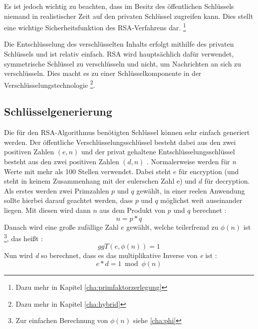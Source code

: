 \documentclass[12pt,a4paper]{scrartcl}
\begin{document}
Es ist jedoch wichtig zu beachten, dass im Besitz des öffentlichen Schlüssels niemand in realistischer Zeit auf den privaten Schlüssel zugreifen kann. Dies stellt eine wichtige Sicherheitsfunktion des RSA-Verfahrens dar. \footnote{Dazu mehr in Kapitel \ref{cha:primfaktorzerlegung}}

Die Entschlüsselung des verschlüsselten Inhalts erfolgt mithilfe des privaten Schlüssels und ist relativ einfach. RSA wird hauptsächlich dafür verwendet, symmetrische Schlüssel zu verschlüsseln und nicht, um Nachrichten an sich zu verschlüsseln. Dies macht es zu einer Schlüsselkomponente in der Verschlüsselungstechnologie \footnote{Dazu mehr in Kapitel \ref{cha:hybrid}}.

	\subsection{Schlüsselgenerierung}
Die für den RSA-Algorithmus benötigten Schlüssel können sehr einfach generiert werden. Der öffentliche Verschlüsselungsschlüssel besteht dabei aus den zwei positiven Zahlen $(e, n)$ und der privat gehaltene Entschlüsselungsschlüssel besteht aus den zwei positiven Zahlen $(d, n)$ \cite[S.6]{rsaOriginalPaper}. Normalerweise   werden für \textit{n} Werte mit mehr als 100 Stellen verwendet. Dabei steht $e$ für encryption (und steht in keinem Zusammenhang mit der eulerschen Zahl e) und $d$ für decryption.  
Als erstes werden zwei Primzahlen $p$ und $q$ gewählt, in einer reelen Anwendung sollte hierbei darauf geachtet werden, dass $p$ und $q$ möglichst weit auseinander liegen. \cite[S.8f]{rowland}
Mit diesen wird dann $n$ aus dem Produkt von $p$ und $q$ berechnet \cite[S.6]{rsaOriginalPaper}: 
$$n = p*q$$
Danach wird eine große zufällige Zahl $e$ gewählt, welche teilerfremd zu ${\phi(n)}$ ist \footnote{Zur einfachen Berechnung von ${\phi(n)}$ siehe \ref{cha:phi}}, das heißt \cite[S.6]{rsaOriginalPaper}:
$${ggT(e, \phi(n)) = 1}$$ 
Nun wird \textit{d} so berechnet, dass es das multiplikative Inverse von \textit{e} ist \cite[S.7]{rsaOriginalPaper}:
$${e * d = 1 \bmod \phi(n)}$$
\end{document}
